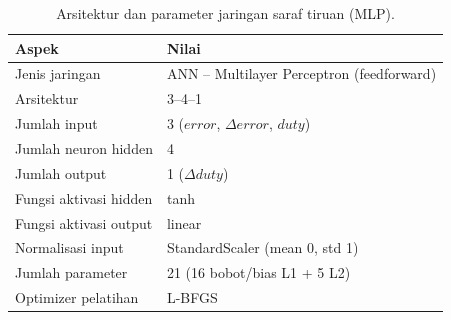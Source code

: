 
\begin{table}[h]
  \centering
  \caption{Arsitektur dan parameter jaringan saraf tiruan (MLP).}
  \label{tab:arsitektur_mlp}
  \begin{tabular}{ll}
    \hline
    \textbf{Aspek} & \textbf{Nilai} \\
    \hline
    Jenis jaringan          & ANN -- Multilayer Perceptron (feedforward) \\
    Arsitektur              & 3--4--1 \\
    Jumlah input            & 3 ($error$, $\Delta error$, $duty$) \\
    Jumlah neuron hidden    & 4 \\
    Jumlah output           & 1 ($\Delta duty$) \\
    Fungsi aktivasi hidden  & tanh \\
    Fungsi aktivasi output  & linear \\
    Normalisasi input       & StandardScaler (mean 0, std 1) \\
    Jumlah parameter        & 21 (16 bobot/bias L1 + 5 L2) \\
    Optimizer pelatihan     & L-BFGS \\
    \hline
  \end{tabular}
\end{table}

